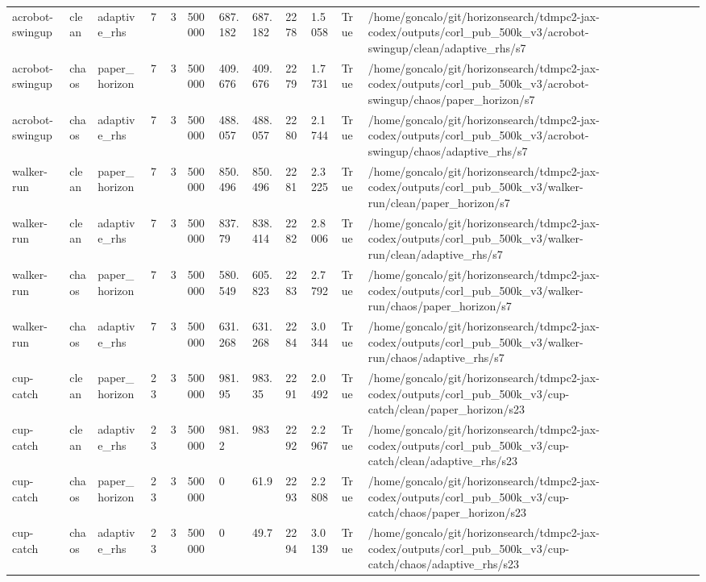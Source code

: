 \begin{tabular}{llllllllllll}
acrobot-swingup & clean & adaptive\_rhs & 7 & 3 & 500000 & 687.182 & 687.182 & 2278 & 1.5058 & True & /home/goncalo/git/horizonsearch/tdmpc2-jax-codex/outputs/corl\_pub\_500k\_v3/acrobot-swingup/clean/adaptive\_rhs/s7 \\
acrobot-swingup & chaos & paper\_horizon & 7 & 3 & 500000 & 409.676 & 409.676 & 2279 & 1.7731 & True & /home/goncalo/git/horizonsearch/tdmpc2-jax-codex/outputs/corl\_pub\_500k\_v3/acrobot-swingup/chaos/paper\_horizon/s7 \\
acrobot-swingup & chaos & adaptive\_rhs & 7 & 3 & 500000 & 488.057 & 488.057 & 2280 & 2.1744 & True & /home/goncalo/git/horizonsearch/tdmpc2-jax-codex/outputs/corl\_pub\_500k\_v3/acrobot-swingup/chaos/adaptive\_rhs/s7 \\
walker-run & clean & paper\_horizon & 7 & 3 & 500000 & 850.496 & 850.496 & 2281 & 2.3225 & True & /home/goncalo/git/horizonsearch/tdmpc2-jax-codex/outputs/corl\_pub\_500k\_v3/walker-run/clean/paper\_horizon/s7 \\
walker-run & clean & adaptive\_rhs & 7 & 3 & 500000 & 837.79 & 838.414 & 2282 & 2.8006 & True & /home/goncalo/git/horizonsearch/tdmpc2-jax-codex/outputs/corl\_pub\_500k\_v3/walker-run/clean/adaptive\_rhs/s7 \\
walker-run & chaos & paper\_horizon & 7 & 3 & 500000 & 580.549 & 605.823 & 2283 & 2.7792 & True & /home/goncalo/git/horizonsearch/tdmpc2-jax-codex/outputs/corl\_pub\_500k\_v3/walker-run/chaos/paper\_horizon/s7 \\
walker-run & chaos & adaptive\_rhs & 7 & 3 & 500000 & 631.268 & 631.268 & 2284 & 3.0344 & True & /home/goncalo/git/horizonsearch/tdmpc2-jax-codex/outputs/corl\_pub\_500k\_v3/walker-run/chaos/adaptive\_rhs/s7 \\
cup-catch & clean & paper\_horizon & 23 & 3 & 500000 & 981.95 & 983.35 & 2291 & 2.0492 & True & /home/goncalo/git/horizonsearch/tdmpc2-jax-codex/outputs/corl\_pub\_500k\_v3/cup-catch/clean/paper\_horizon/s23 \\
cup-catch & clean & adaptive\_rhs & 23 & 3 & 500000 & 981.2 & 983 & 2292 & 2.2967 & True & /home/goncalo/git/horizonsearch/tdmpc2-jax-codex/outputs/corl\_pub\_500k\_v3/cup-catch/clean/adaptive\_rhs/s23 \\
cup-catch & chaos & paper\_horizon & 23 & 3 & 500000 & 0 & 61.9 & 2293 & 2.2808 & True & /home/goncalo/git/horizonsearch/tdmpc2-jax-codex/outputs/corl\_pub\_500k\_v3/cup-catch/chaos/paper\_horizon/s23 \\
cup-catch & chaos & adaptive\_rhs & 23 & 3 & 500000 & 0 & 49.7 & 2294 & 3.0139 & True & /home/goncalo/git/horizonsearch/tdmpc2-jax-codex/outputs/corl\_pub\_500k\_v3/cup-catch/chaos/adaptive\_rhs/s23 \\

\end{tabular}
